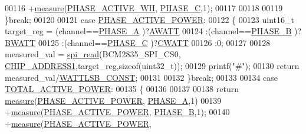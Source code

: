 \begin{DoxyCode}
00116                             +\hyperlink{a00009_gac914ebaa64afce03ee852af09659cf69}{measure}(\hyperlink{a00043_a4ee773ad07fa969b9990f9bb3a1a2093}{PHASE\_ACTIVE\_WH},
      \hyperlink{a00043_a3ceb83fb10c2af19b468d508448f24e2}{PHASE\_C},1);
00117                      
00118                 
00119                 \}\textcolor{keywordflow}{break};
00120                 
00121                 \textcolor{keywordflow}{case}  \hyperlink{a00043_abd3f95c7cd63d0627552d293bf49e026}{PHASE\_ACTIVE\_POWER}:
00122                 \{
00123                     uint16\_t target\_reg =    (channel==\hyperlink{a00043_ad214039f52b011ce2bd6c85ff98a981b}{PHASE\_A} )?\hyperlink{a00036_a70d4c8c1577490f1b69cfab591458142}{AWATT}
00124                                             :(channel==\hyperlink{a00043_ad7b96feed1e1c12515dad5e926b2c62e}{PHASE\_B} )?\hyperlink{a00036_a3a60995ae993fd06892df7023a9f496c}{BWATT}
00125                                             :(channel==\hyperlink{a00043_a3ceb83fb10c2af19b468d508448f24e2}{PHASE\_C} )?\hyperlink{a00036_aeb58aae2f3e0c16a12cf4b6b03d6c5d9}{CWATT}
00126                                             :0;         
00127                                           
00128                     measured\_val = \hyperlink{a00007_ga7ad9f65ee46aca507374096506a0b1c4}{spi\_read}(BCM2835\_SPI\_CS0,
      \hyperlink{a00037_a94de2b046db6e10257ef4481c0a15eaa}{CHIP\_ADDRESS1},target\_reg,\textcolor{keyword}{sizeof}(uint32\_t));
00129                     printf(\textcolor{stringliteral}{"#"});
00130                     \textcolor{keywordflow}{return} measured\_val/\hyperlink{a00037_a218dca2818f6fa6923467998b967a084}{WATTLSB\_CONST};
00131                     
00132                 \}\textcolor{keywordflow}{break};
00133                 
00134                 \textcolor{keywordflow}{case}  \hyperlink{a00043_a7d0d4057be5aaf168a22ee4379e6ff30}{TOTAL\_ACTIVE\_POWER}:
00135                 \{
00136                 
00137                             
00138                      \textcolor{keywordflow}{return} \hyperlink{a00009_gac914ebaa64afce03ee852af09659cf69}{measure}(\hyperlink{a00043_abd3f95c7cd63d0627552d293bf49e026}{PHASE\_ACTIVE\_POWER},
      \hyperlink{a00043_ad214039f52b011ce2bd6c85ff98a981b}{PHASE\_A},1)
00139                             +\hyperlink{a00009_gac914ebaa64afce03ee852af09659cf69}{measure}(\hyperlink{a00043_abd3f95c7cd63d0627552d293bf49e026}{PHASE\_ACTIVE\_POWER},
      \hyperlink{a00043_ad7b96feed1e1c12515dad5e926b2c62e}{PHASE\_B},1);
00140                             +\hyperlink{a00009_gac914ebaa64afce03ee852af09659cf69}{measure}(\hyperlink{a00043_abd3f95c7cd63d0627552d293bf49e026}{PHASE\_ACTIVE\_POWER},

\end{DoxyCode}
